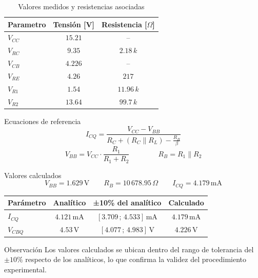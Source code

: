 \begin{frame}{}
  \begin{table}[H]
    \centering
    \caption{Valores medidos y resistencias asociadas}
    \begin{tabular}{lcc}
    \toprule
    \textbf{Parametro} & \textbf{Tensión [V]} & \textbf{Resistencia [\(\Omega\)]} \\
    \midrule
    $V_{CC}$ & $15.21$ & -- \\
    $V_{RC}$ & $9.35$  & $2.18\,k$ \\
    $V_{CB}$ & $4.226$ & -- \\
    $V_{RE}$ & $4.26$  & $217$ \\
    $V_{R1}$ & $1.54$  & $11.96\,k$ \\
    $V_{R2}$ & $13.64$ & $99.7\,k$ \\
    \bottomrule
    \end{tabular}
  \end{table}
\end{frame}


\begin{frame}{}

  \begin{block}{Ecuaciones de referencia}
    \[
      I_{CQ} = \frac{V_{CC} - V_{BB}}{R_C + (R_C \parallel R_L) - \tfrac{R_B}{\beta}}
    \]
    \[
      V_{BB} = V_{CC}\cdot \frac{R_1}{R_1 + R_2}
      \qquad\qquad
      R_B = R_1 \parallel R_2
    \]
  \end{block}

  \begin{block}{Valores calculados}
    \[
      V_{BB} = 1.629 \,\text{V}
      \qquad
      R_B = 10\,678.95 \,\Omega
      \qquad
      I_{CQ} = 4.179 \,\text{mA}
    \]
  \end{block}

\end{frame}


\begin{frame}{}

  \begin{table}[H]
  \centering
  \begin{tabular}{lccc}
    \toprule
    \textbf{Parámetro} & \textbf{Analítico} & \textbf{±10\% del analítico} & \textbf{Calculado} \\
    \midrule
    $I_{CQ}$  & $4.121\,\text{mA}$ & $[3.709\,;\,4.533]\,\text{mA}$ & $4.179\,\text{mA}$ \\
    $V_{CBQ}$ & $4.53\,\text{V}$   & $[4.077\,;\,4.983]\,\text{V}$  & $4.226\,\text{V}$ \\
    \bottomrule
  \end{tabular}
  \end{table}

  \vspace{1em}

  \begin{block}{Observación}
    Los valores calculados se ubican dentro del rango de tolerancia del
    $\pm 10\%$ respecto de los analíticos, lo que confirma la validez del
    procedimiento experimental.
  \end{block}

\end{frame}




